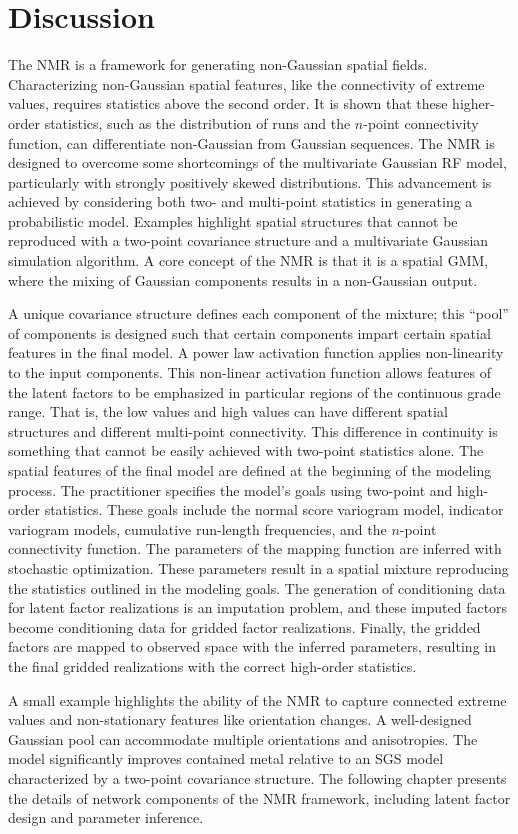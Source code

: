 \FloatBarrier
\section{Discussion}
\label{sec:03discuss}

The \gls{NMR} is a framework for generating non-Gaussian spatial fields. Characterizing non-Gaussian spatial features, like the connectivity of extreme values, requires statistics above the second order. It is shown that these higher-order statistics, such as the distribution of runs and the $n$-point connectivity function, can differentiate non-Gaussian from Gaussian sequences. The \gls{NMR} is designed to overcome some shortcomings of the multivariate Gaussian \gls{RF} model, particularly with strongly positively skewed distributions. This advancement is achieved by considering both two- and multi-point statistics in generating a probabilistic model. Examples highlight spatial structures that cannot be reproduced with a two-point covariance structure and a multivariate Gaussian simulation algorithm. A core concept of the \gls{NMR} is that it is a spatial \gls{GMM}, where the mixing of Gaussian components results in a non-Gaussian output.

A unique covariance structure defines each component of the mixture; this ``pool'' of components is designed such that certain components impart certain spatial features in the final model. A power law activation function applies non-linearity to the input components. This non-linear activation function allows features of the latent factors to be emphasized in particular regions of the continuous grade range. That is, the low values and high values can have different spatial structures and different multi-point connectivity. This difference in continuity is something that cannot be easily achieved with two-point statistics alone. The spatial features of the final model are defined at the beginning of the modeling process. The practitioner specifies the model's goals using two-point and high-order statistics. These goals include the normal score variogram model, indicator variogram models, cumulative run-length frequencies, and the $n$-point connectivity function. The parameters of the mapping function are inferred with stochastic optimization. These parameters result in a spatial mixture reproducing the statistics outlined in the modeling goals. The generation of conditioning data for latent factor realizations is an imputation problem, and these imputed factors become conditioning data for gridded factor realizations. Finally, the gridded factors are mapped to observed space with the inferred parameters, resulting in the final gridded realizations with the correct high-order statistics.

A small example highlights the ability of the \gls{NMR} to capture connected extreme values and non-stationary features like orientation changes. A well-designed Gaussian pool can accommodate multiple orientations and anisotropies. The model significantly improves contained metal relative to an \gls{SGS} model characterized by a two-point covariance structure. The following chapter presents the details of network components of the \gls{NMR} framework, including latent factor design and parameter inference.
